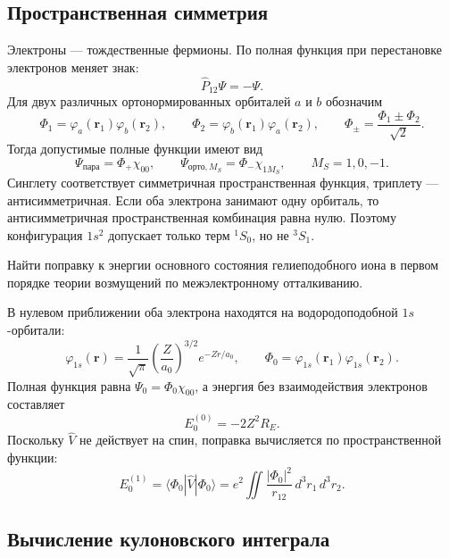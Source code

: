 \documentclass[../final.tex]{subfiles}
\begin{document}
\subsection*{Пространственная симметрия}

Электроны --- тождественные фермионы. По 
полная функция при перестановке электронов меняет знак:
\[
    \hat P_{12}\Psi=-\Psi.
\]
Для двух различных ортонормированных орбиталей $a$ и $b$ обозначим
\[
    \Phi_1=\varphi_a(\mathbf r_1)\varphi_b(\mathbf r_2),\qquad
    \Phi_2=\varphi_b(\mathbf r_1)\varphi_a(\mathbf r_2),
    \qquad \Phi_\pm=\frac{\Phi_1\pm\Phi_2}{\sqrt2}.
\]
Тогда допустимые полные функции имеют вид
\[
    \Psi_{\text{пара}}=\Phi_+\chi_{00},\qquad
    \Psi_{\text{орто},M_S}=\Phi_-\chi_{1M_S},
    \qquad M_S=1,0,-1.
\]
Синглету соответствует симметричная пространственная функция,
триплету --- антисимметричная.
Если оба электрона занимают одну орбиталь, то антисимметричная
пространственная комбинация равна нулю. Поэтому конфигурация $1s^2$
допускает только терм ${}^1S_0$, но не ${}^3S_1$.

\begingroup
\renewcommand{\thesection}{3.\arabic{section}}

\label{task:fiham5_ground_perturbation}

\condition
Найти поправку к энергии основного состояния гелиеподобного иона
в первом порядке теории возмущений по межэлектронному отталкиванию.

\solution
В нулевом приближении оба электрона находятся на водородоподобной
$1s$-орбитали:
\[
    \varphi_{1s}(\mathbf r)=\frac1{\sqrt\pi}
        \left(\frac Z{a_0}\right)^{3/2}e^{-Zr/a_0},\qquad
    \Phi_0=\varphi_{1s}(\mathbf r_1)\varphi_{1s}(\mathbf r_2).
\]
Полная функция равна $\Psi_0=\Phi_0\chi_{00}$, а энергия без
взаимодействия электронов составляет
\[
    E_0^{(0)}=-2Z^2R_E.
\]
Поскольку $\hat V$ не действует на спин, поправка вычисляется
по пространственной функции:
\[
    E_0^{(1)}=\langle\Phi_0|\hat V|\Phi_0\rangle
        =e^2\iint\frac{|\Phi_0|^2}{r_{12}}\,d^3r_1\,d^3r_2.
\]

\subsection*{Вычисление кулоновского интеграла}
\end{document}
